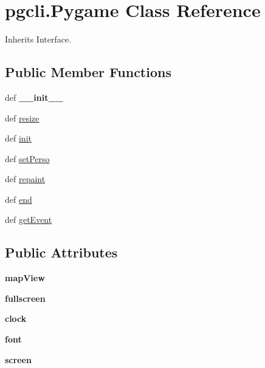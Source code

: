 \hypertarget{classpgcli_1_1_pygame}{\section{pgcli.\-Pygame \-Class \-Reference}
\label{classpgcli_1_1_pygame}
}


\-Inherits \-Interface.

\subsection*{\-Public \-Member \-Functions}
\begin{DoxyCompactItemize}
\item 
\hypertarget{classpgcli_1_1_pygame_af9efbe6614bef07396ca3330837208a2}{def {\bfseries \-\_\-\-\_\-init\-\_\-\-\_\-}}\label{classpgcli_1_1_pygame_af9efbe6614bef07396ca3330837208a2}

\item 
def \hyperlink{classpgcli_1_1_pygame_a72659e4939325f9c60bc21adcdab0a7b}{resize}
\item 
def \hyperlink{classpgcli_1_1_pygame_a5df08390640efd1ceaa9f5b863f63f6e}{init}
\item 
def \hyperlink{classpgcli_1_1_pygame_a75a8861ead408a5b15bdb98760a85424}{set\-Perso}
\item 
def \hyperlink{classpgcli_1_1_pygame_a282d3adefecb0b65fc1eac9c17358426}{repaint}
\item 
def \hyperlink{classpgcli_1_1_pygame_ad683d9fada51a6d1c932f90ecb479f2b}{end}
\item 
def \hyperlink{classpgcli_1_1_pygame_a9b95d01710bb69fdb8ae34ea7d1bfb73}{get\-Event}
\end{DoxyCompactItemize}
\subsection*{\-Public \-Attributes}
\begin{DoxyCompactItemize}
\item 
\hypertarget{classpgcli_1_1_pygame_a90d3567b4f0347e44ecf1dcf5ad6fdee}{{\bfseries map\-View}}\label{classpgcli_1_1_pygame_a90d3567b4f0347e44ecf1dcf5ad6fdee}

\item 
\hypertarget{classpgcli_1_1_pygame_a53fdbbb19cb8b4e601b4d1d7ef197be3}{{\bfseries fullscreen}}\label{classpgcli_1_1_pygame_a53fdbbb19cb8b4e601b4d1d7ef197be3}

\item 
\hypertarget{classpgcli_1_1_pygame_aa5e50fef4d28b35ae8ce2f5cd5850aad}{{\bfseries clock}}\label{classpgcli_1_1_pygame_aa5e50fef4d28b35ae8ce2f5cd5850aad}

\item 
\hypertarget{classpgcli_1_1_pygame_a8223dd8b6a8becaae1b5cbd55313cad5}{{\bfseries font}}\label{classpgcli_1_1_pygame_a8223dd8b6a8becaae1b5cbd55313cad5}

\item 
\hypertarget{classpgcli_1_1_pygame_afb128fb6e354a3633102ea5c8acb56c1}{{\bfseries screen}}\label{classpgcli_1_1_pygame_afb128fb6e354a3633102ea5c8acb56c1}

\end{DoxyCompactItemize}


